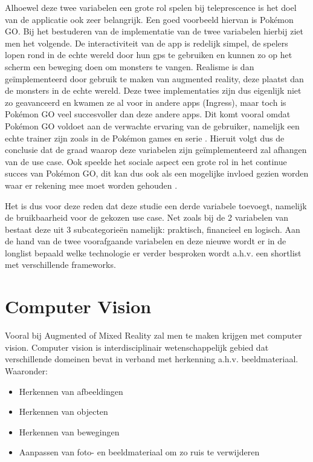 Alhoewel deze twee variabelen een grote rol spelen bij teleprescence is het doel van de applicatie ook zeer belangrijk. Een goed voorbeeld hiervan is Pokémon GO. Bij het bestuderen van de implementatie van de twee variabelen hierbij ziet men het volgende. De interactiviteit van de app is redelijk simpel, de spelers lopen rond in de echte wereld door hun gps te gebruiken en kunnen zo op het scherm een beweging doen om monsters te vangen. Realisme is dan geïmplementeerd door gebruik te maken van augmented reality, deze plaatst dan de monsters in de echte wereld. Deze twee implementaties zijn dus eigenlijk niet zo geavanceerd en kwamen ze al voor in andere apps (Ingress), maar toch is Pokémon GO veel succesvoller dan deze andere apps. Dit komt vooral omdat Pokémon GO voldoet aan de verwachte ervaring van de gebruiker, namelijk een echte trainer zijn zoals in de Pokémon games en serie \autocite{Tang2017}. Hieruit volgt dus de conclusie dat de graad waarop deze variabelen zijn geïmplementeerd zal afhangen van de use case. Ook speelde het sociale aspect een grote rol in het continue succes van Pokémon GO, dit kan dus ook als een mogelijke invloed gezien worden waar er rekening mee moet worden gehouden \autocite{Tang2017}.


Het is dus voor deze reden dat deze studie een derde variabele toevoegt, namelijk de bruikbaarheid voor de gekozen use case. Net zoals bij de 2 variabelen van \textcite{Steuer1992} bestaat deze uit 3 subcategorieën namelijk: praktisch, financieel en logisch. Aan de hand van de twee voorafgaande variabelen en deze nieuwe wordt er in de longlist bepaald welke technologie er verder besproken wordt a.h.v. een shortlist met verschillende frameworks. 

\section{Computer Vision}
Vooral bij Augmented of Mixed Reality zal men te maken krijgen met computer vision. Computer vision is interdisciplinair wetenschappelijk gebied dat verschillende domeinen bevat in verband met herkenning a.h.v. beeldmateriaal. Waaronder: 

\begin{itemize}
    \item Herkennen van afbeeldingen
    \item Herkennen van objecten
    \item Herkennen van bewegingen
    \item Aanpassen van foto- en beeldmateriaal om zo ruis te verwijderen
\end{itemize}

